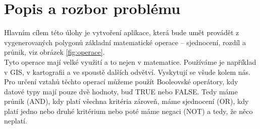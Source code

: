 \documentclass[a4paper,11pt,twoside]{article}
\begin{document}
\renewcommand{\baselinestretch}{1.4} %
\newpage
\tableofcontents %

\newpage
\listoffigures %

\thispagestyle{empty}
\newcommand{\obrazek}[1]{(viz obr. \ref{#1})} %

\newpage
\pagestyle{fancy}


\renewcommand{\sectionmark}[1]{\markright{\ #1}}

\fancyhf{} %
\renewcommand{\headrulewidth}{0.4pt} %
\renewcommand{\footrulewidth}{0.4pt}  %
\addtolength{\voffset}{-0.4cm}

\fancyhead[RE, RO]{\nouppercase{\rightmark}}
   
\fancyfoot[RO, LE]{{\textsc{\small \thepage}}}

\fancypagestyle{plain}{
  \fancyhead{} %
  \renewcommand{\headrulewidth}{0pt} %
}



\pagestyle{fancy}
\newpage

\vspace*{-1cm}
\section{Popis a rozbor problému}
\large
\renewcommand{\baselinestretch}{1.4}
\noindent Hlavním cílem této úlohy je vytvoření aplikace, která bude umět provádět z vygenerovaných polygonů základní matematické operace – sjednocení, rozdíl a průnik, viz obrázek \ref{fig:operace}.\\
\indent Tyto operace mají velké využití a to nejen v matematice. Používáme je například v GIS, v kartografii a ve spoustě dalších odvětví. Vyskytují se všude kolem nás. Pro určení vztahů těchto operací můžeme použít Booleovské operátory, kdy datové typy mají pouze dvě hodnoty, buď TRUE nebo FALSE. Tedy máme průnik (AND), kdy platí všechna kritéria zároveň, máme sjednocení (OR), kdy platí jedno nebo druhé kritérium nebo poté máme negaci (NOT) a tedy, že něco neplatí.
\end{document}
